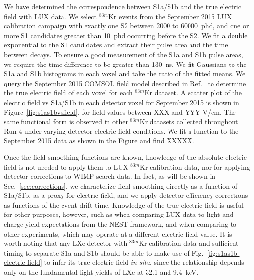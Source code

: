 We have determined the correspondence between S1a/S1b and the true electric
field with LUX data.
We select $^{83m}$Kr events from the September 2015 LUX calibration campaign
with exactly one S2 between 2000 to 60000~phd, and one or more S1 candidates 
greater than 10~phd occurring before the S2. We fit a double exponential to the S1 candidates and 
extract their pulse area and the time between decays. To ensure a good measurement of the 
S1a and S1b pulse areas, we require the time difference to be greater than 130~ns. 
We fit Gaussians to the S1a and S1b histograms in each voxel and take the ratio of the fitted means. 
We query the September 2015 COMSOL field model described in 
Ref.~\cite{luciespaper} to determine the 
true electric field of each voxel for each $^{83m}$Kr dataset. 
A scatter plot of the electric field vs S1a/S1b in each detector voxel for September 2015 
is shown in Figure~\ref{fig:s1as1bvsfield}, for field values between XXX and YYY V/cm. 
The same functional form is  observed in other $^{83m}$Kr datasets 
collected throughout Run 4 under 
varying detector electric field conditions. We fit a function to the September 2015 data as 
shown in the Figure and find XXXXX.




Once the field smoothing functions are known, 
knowledge of the absolute electric field is not needed to apply them
to LUX $^{83m}$Kr calibration data, nor for applying detector corrections
to WIMP search data. In fact, as will be shown in Sec.~\ref{sec:corrections}, 
we characterize field-smoothing directly as a function of
S1a/S1b, as a proxy for electric field, 
and we apply detector efficiency corrections as functions of the event drift time. 
Knowledge of the true electric field is useful for other purposes, however,
such as when comparing LUX data to light and charge yield expectations from the NEST framework, 
and when comparing to other experiments, which may operate at a different electric field value. 
It is worth noting that any LXe detector with $^{83m}$Kr calibration data and sufficient
timing to separate S1a and S1b should be able to make use of Fig.~\ref{fig:s1as1b-electric-field}
to infer its true electric field \emph{in situ}, since the relationship depends only on the 
fundamental light yields of LXe at 32.1 and 9.4~keV.


